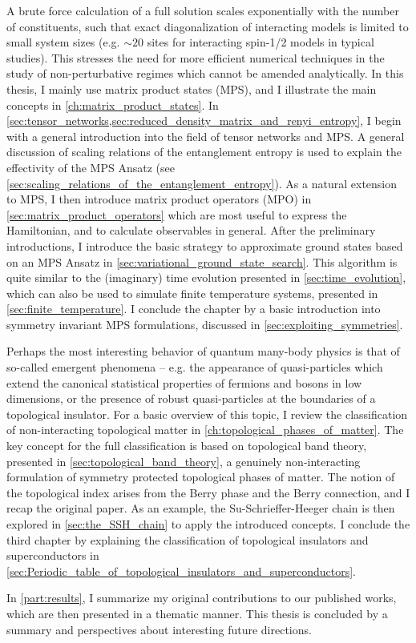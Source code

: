 A brute force calculation of a full solution scales exponentially with the number of constituents, such that exact diagonalization of interacting models is limited to small system sizes (e.g. $\sim 20$ sites for interacting spin-1/2 models in typical studies).
This stresses the need for more efficient numerical techniques in the study of non-perturbative regimes which cannot be amended analytically.
In this thesis, I mainly use matrix product states (MPS), and I illustrate the main concepts in \cref{ch:matrix_product_states}.
In \cref{sec:tensor_networks,sec:reduced_density_matrix_and_renyi_entropy}, I begin with a general introduction into the field of tensor networks and MPS.
A general discussion of scaling relations of the entanglement entropy is used to explain the effectivity of the MPS Ansatz (see \cref{sec:scaling_relations_of_the_entanglement_entropy}).
As a natural extension to MPS, I then introduce matrix product operators (MPO) in \cref{sec:matrix_product_operators} which are most useful to express the Hamiltonian, and to calculate observables in general.
After the preliminary introductions, I introduce the basic strategy to approximate ground states based on an MPS Ansatz in \cref{sec:variational_ground_state_search}.
This algorithm is quite similar to the (imaginary) time evolution presented in \cref{sec:time_evolution}, which can also be used to simulate finite temperature systems, presented in \cref{sec:finite_temperature}.
I conclude the chapter by a basic introduction into symmetry invariant MPS formulations, discussed in \cref{sec:exploiting_symmetries}.

Perhaps the most interesting behavior of quantum many-body physics is that of so-called emergent phenomena -- e.g. the appearance of quasi-particles which extend the canonical statistical properties of fermions and bosons in low dimensions, or the presence of robust quasi-particles at the boundaries of a topological insulator.
For a basic overview of this topic, I review the classification of non-interacting topological matter in \cref{ch:topological_phases_of_matter}.
The key concept for the full classification is based on topological band theory, presented in \cref{sec:topological_band_theory}, a genuinely non-interacting formulation of symmetry protected topological phases of matter.
The notion of the topological index arises from the Berry phase and the Berry connection, and I recap the original paper.
As an example, the Su-Schrieffer-Heeger chain is then explored in \cref{sec:the_SSH_chain} to apply the introduced concepts.
I conclude the third chapter by explaining the classification of topological insulators and superconductors in \cref{sec:Periodic_table_of_topological_insulators_and_superconductors}.

In \cref{part:results}, I summarize my original contributions to our published works, which are then presented in a thematic manner.
This thesis is concluded by a summary and perspectives about interesting future directions.
